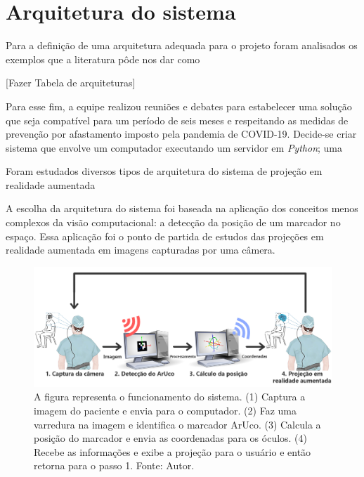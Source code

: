 \section{Arquitetura do sistema}

Para a definição de uma arquitetura adequada para o projeto foram analisados os exemplos que a literatura pôde nos dar como

[Fazer Tabela de arquiteturas]

Para esse fim, a equipe realizou reuniões e debates para estabelecer uma solução que seja compatível para um período de seis meses e respeitando as medidas de prevenção por afastamento imposto pela pandemia de COVID-19. Decide-se criar sistema que envolve um computador executando um servidor em \textit{Python}; uma 


Foram estudados diversos tipos de arquitetura do sistema de projeção em realidade aumentada

A escolha da arquitetura do sistema foi baseada na aplicação dos conceitos menos complexos da visão computacional: a detecção da posição de um marcador no espaço. Essa aplicação foi o ponto de partida de estudos das projeções em realidade aumentada em imagens capturadas por uma câmera.

\begin{figure}[ht]
    \centering
    \includegraphics[width=.9\linewidth]{figuras/System schematic.png}
    \caption{A figura representa o funcionamento do sistema. (1) Captura a imagem do paciente e envia para o computador. (2) Faz uma varredura na imagem e identifica o marcador ArUco. (3) Calcula a posição do marcador e envia as coordenadas para os óculos. (4) Recebe as informações e exibe a projeção para o usuário e então retorna para o passo 1. Fonte: Autor.}
    \label{fig:arc}
\end{figure}

